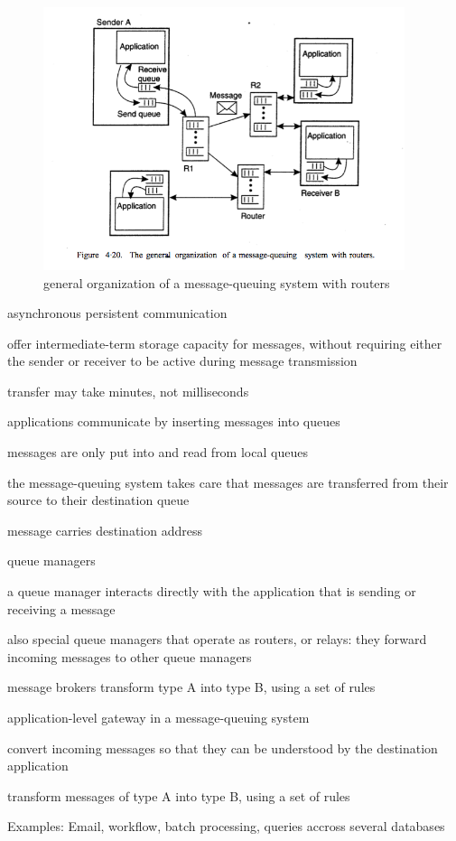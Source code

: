 \documentclass[ngerman,a4paper]{report}
\begin{document}
\begin{figure}[h]
	\centering
	\includegraphics[width=400px]{gfx/mom.png}
	\caption{general organization of a message-queuing system with routers}
	\label{img:mom}
\end{figure}

\begin{compactitem}
	\item asynchronous persistent communication
	\item offer intermediate-term storage capacity for messages, without requiring either the sender or receiver to be active during message transmission
	\item transfer may take minutes, not milliseconds
	\item applications communicate by inserting messages into queues
	\item messages are only put into and read from local queues
	\item the message-queuing system takes care that messages are transferred from their source to their destination queue
	\item message carries destination address
	\item queue managers
	\begin{compactitem}
		\item a queue manager interacts directly with the application that is sending or receiving a message
		\item also special queue managers that operate as routers, or relays: they forward incoming messages to other queue managers
	\end{compactitem}
	\item message brokers transform type A into type B, using a set of rules
		\begin{compactitem}
		\item application-level gateway in a message-queuing system
		\item convert incoming messages so that they can be understood by the destination application
		\item transform messages of type A into type B, using a set of rules
	\end{compactitem}
	\item Examples: Email, workflow, batch processing, queries accross several databases
\end{compactitem}
\end{document}
